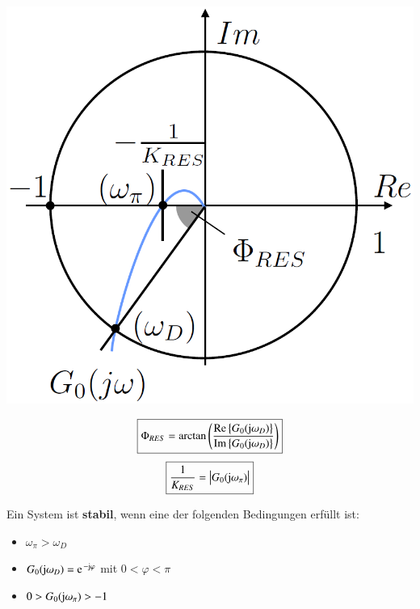 \begin{minipage}[c]{0.48\columnwidth}
    \includegraphics[width=\columnwidth]{images/stabilitaetsreserven_1.png}
\end{minipage}
\hfill
\begin{minipage}[c]{0.5\columnwidth}

    $$ \boxed{\Phi_{RES} = \arctan \left( \frac{\operatorname{Re}\left\{G_{0}(\mathrm{j} \omega_{D})\right\}}{\operatorname{Im}\left\{G_{0}(\mathrm{j} \omega_{D})\right\}} \right) } $$
    $$ \boxed{\frac{1}{K_{RES}} = \big| G_{0}(\mathrm{j} \omega_{\pi}) \big| } $$


     Ein System ist \textbf{stabil}, wenn eine der folgenden Bedingungen erfüllt ist:
     \vspace{0.2cm}

     \begin{itemize}
        \setlength\itemsep{4pt}
        \item $\omega_{\pi} > \omega_{D}$
        \item $G_{0}(\jimg \omega_{D}) = \e^{- \jimg \varphi}$ \quad mit $0 < \varphi < \pi$
        \item $0 > G_{0}(\mathrm{j} \omega_{\pi}) > -1 $
     \end{itemize}
\end{minipage}

\vspace{0.2cm}

